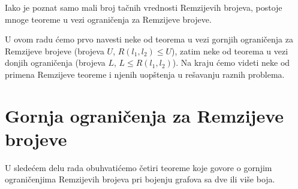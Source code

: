 \documentclass{article}
\theoremstyle{definition}
\newtheorem{teorema}{Teorema}[section]
\newcommand{\dokaz}[1]{\begin{proof}[Dokaz]#1\end{proof}}
\begin{document}
	
	
	Iako je poznat samo mali broj tačnih vrednosti Remzijevih brojeva, postoje mnoge teoreme u vezi ograničenja za Remzijeve brojeve. 
	
	U ovom radu ćemo prvo navesti neke od teorema u vezi gornjih ograničenja za Remzijeve brojeve (brojeva $U$, $R(l_1,l_2)\leq U$), zatim neke od teorema u vezi donjih ograničenja (brojeva $L$, $L \leq R(l_1,l_2)$). Na kraju ćemo videti neke od primena Remzijeve teoreme i njenih uopštenja u rešavanju raznih problema.
	
	
	
	\newpage
	
	\section{Gornja ograničenja za Remzijeve brojeve}
	
	U sledećem delu rada obuhvatićemo četiri teoreme koje govore o gornjim  ograničenjima Remzijevih brojeva pri bojenju grafova sa dve ili više boja.
	

	
\end{document}
